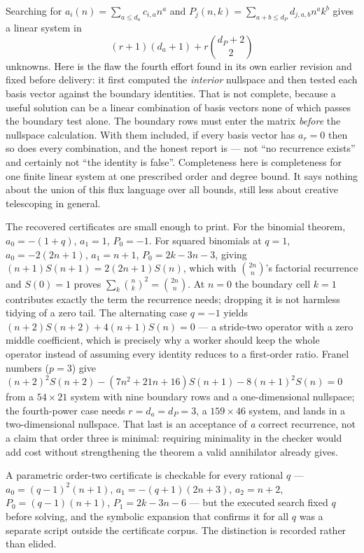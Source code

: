 Searching for $a_i(n)=\sum_{a\le d_a}c_{i,a}n^a$ and
$P_j(n,k)=\sum_{a+b\le d_P}d_{j,a,b}n^ak^b$ gives a linear system in
\[
 (r+1)(d_a+1)+r\binom{d_P+2}{2}
\]
unknowns. Here is the flaw the fourth effort found in its own earlier revision
and fixed before delivery: it first computed the \emph{interior} nullspace and
then tested each basis vector against the boundary identities. That is not
complete, because a useful solution can be a linear combination of basis vectors
none of which passes the boundary test alone. The boundary rows must enter the
matrix \emph{before} the nullspace calculation. With them included, if every
basis vector has $a_r=0$ then so does every combination, and the honest report
is  --- not ``no recurrence exists'' and certainly
not ``the identity is false''. Completeness here is completeness for one finite
linear system at one prescribed order and degree bound. It says nothing about
the union of this flux language over all bounds, still less about creative
telescoping in general.

The recovered certificates are small enough to print. For the binomial theorem,
$a_0=-(1+q)$, $a_1=1$, $P_0=-1$. For squared binomials at $q=1$,
$a_0=-2(2n+1)$, $a_1=n+1$, $P_0=2k-3n-3$, giving $(n+1)S(n+1)=2(2n+1)S(n)$,
which with $\binom{2n}{n}$'s factorial recurrence and $S(0)=1$ proves
$\sum_k\binom nk^2=\binom{2n}n$. At $n=0$ the boundary cell $k=1$ contributes
exactly the term the recurrence needs; dropping it is not harmless tidying of a
zero tail. The alternating case $q=-1$ yields $(n+2)S(n+2)+4(n+1)S(n)=0$ --- a
stride-two operator with a zero middle coefficient, which is precisely why a
worker should keep the whole operator instead of assuming every identity
reduces to a first-order ratio. Franel numbers ($p=3$) give
$(n+2)^2S(n+2)-(7n^2+21n+16)S(n+1)-8(n+1)^2S(n)=0$ from a $54\times21$ system
with nine boundary rows and a one-dimensional nullspace; the fourth-power case
needs $r=d_a=d_P=3$, a $159\times46$ system, and lands in a two-dimensional
nullspace. That last is an acceptance of \emph{a} correct recurrence, not a
claim that order three is minimal: requiring minimality in the checker would add
cost without strengthening the theorem a valid annihilator already gives.

A parametric order-two certificate is checkable for every rational $q$ ---
$a_0=(q-1)^2(n+1)$, $a_1=-(q+1)(2n+3)$, $a_2=n+2$, $P_0=(q-1)(n+1)$,
$P_1=2k-3n-6$ --- but the executed search fixed $q$ before solving, and the
symbolic expansion that confirms it for all $q$ was a separate script outside
the certificate corpus. The distinction is recorded rather than elided.

